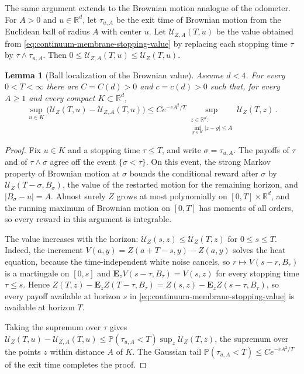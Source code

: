\documentclass[11pt]{amsart}
\theoremstyle{plain}
\newtheorem{lemma}[theorem]{Lemma}
\theoremstyle{definition}
\newcommand{\R}{\mathbb{R}}
\renewcommand{\P}{\mathbb{P}}
\begin{document}
	The same argument extends to the Brownian motion analogue of the odometer. For $A>0$ and
	$u\in\R^d$, let $\tau_{u,A}$ be the exit time of Brownian motion from the
	Euclidean ball of radius $A$ with center $u$. Let $\mathcal U_{Z,A}(T,u)$
	be the value obtained from \eqref{eq:continuum-membrane-stopping-value} by
	replacing each stopping time $\tau$ by $\tau\wedge\tau_{u,A}$. Then
	$0\leq\mathcal U_{Z,A}(T,u)\leq\mathcal U_Z(T,u)$.

	\begin{lemma}[Ball localization of the Brownian value]\label{lem:brownian-ball-localization}
	Assume $d<4$. For every $0<T<\infty$ there are $C=C(d)>0$ and $c=c(d)>0$
	such that, for every $A\geq1$ and every compact $K\subset\R^d$,
	\[
		\sup_{u\in K}
		\bigl(\mathcal U_Z(T,u)-\mathcal U_{Z,A}(T,u)\bigr)
		\leq
		Ce^{-cA^2/T}
		\sup_{\substack{z\in\R^d:\\ \inf_{y\in K}|z-y|\leq A}}
		\mathcal U_Z(T,z)\, .
	\]
	\end{lemma}
	\begin{proof}
		Fix $u\in K$ and a stopping time $\tau\leq T$, and write
		$\sigma=\tau_{u,A}$. The payoffs of $\tau$ and of $\tau\wedge\sigma$ agree
		off the event $\{\sigma<\tau\}$. On this event, the strong Markov property
		of Brownian motion at $\sigma$ bounds the conditional reward after $\sigma$
		by $\mathcal U_Z(T-\sigma,B_\sigma)$, the value of the restarted motion for
		the remaining horizon, and $|B_\sigma-u|=A$. Almost surely $Z$ grows at most
		polynomially on $[0,T]\times\R^d$, and the running maximum of Brownian
		motion on $[0,T]$ has moments of all orders, so every reward in this
		argument is integrable.

		The value increases with the horizon: $\mathcal U_Z(s,z)\leq\mathcal
		U_Z(T,z)$ for $0\leq s\leq T$. Indeed, the increment
		$V(a,y)=Z(a+T-s,y)-Z(a,y)$ solves the heat equation, because the
		time-independent white noise cancels, so $r\mapsto V(s-r,B_r)$ is a
		martingale on $[0,s]$ and $\mathbf E_z V(s-\tau,B_\tau)=V(s,z)$ for every
		stopping time $\tau\leq s$. Hence
		$Z(T,z)-\mathbf E_z Z(T-\tau,B_\tau)=Z(s,z)-\mathbf E_z Z(s-\tau,B_\tau)$,
		so every payoff available at horizon $s$ in
		\eqref{eq:continuum-membrane-stopping-value} is available at horizon $T$.

		Taking the supremum over $\tau$ gives
		$\mathcal U_Z(T,u)-\mathcal U_{Z,A}(T,u)\leq\P(\tau_{u,A}<T)\sup_z
		\mathcal U_Z(T,z)$, the supremum over the points $z$ within distance $A$ of
		$K$. The Gaussian tail $\P(\tau_{u,A}<T)\leq Ce^{-cA^2/T}$ of the exit time
		completes the proof.
	\end{proof}
\end{document}
